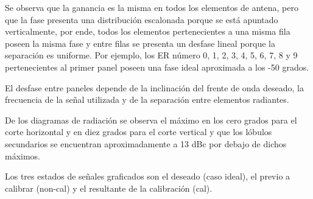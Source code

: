 Se observa que la ganancia es la misma en todos los elementos de antena, pero que la fase presenta una distribución escalonada
porque se está apuntado verticalmente, por ende, todos los elementos pertenecientes a una misma fila poseen la misma fase y entre
filas se presenta un desfase lineal porque la separación es uniforme. Por ejemplo, los ER número 0, 1, 2, 3, 4, 5, 6, 7, 8 y 9
pertenecientes al primer panel poseen una fase ideal aproximada a los -50 grados.

El desfase entre paneles depende de la inclinación del frente de onda deseado, la frecuencia de la señal utilizada y de la
separación entre elementos radiantes.

De los diagramas de radiación se observa el máximo en los cero grados para el corte horizontal y en diez grados para el corte
vertical y que los lóbulos secundarios se encuentran aproximadamente a 13 dBc por debajo de dichos máximos.

Los tres estados de señales graficados son el deseado (caso ideal), el previo a calibrar (non-cal) y el resultante de la
calibración (cal).

